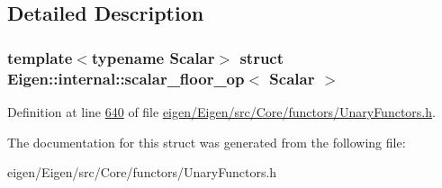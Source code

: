 \subsection{Detailed Description}
\subsubsection*{template$<$typename Scalar$>$\newline
struct Eigen\+::internal\+::scalar\+\_\+floor\+\_\+op$<$ Scalar $>$}



Definition at line \hyperlink{eigen_2_eigen_2src_2_core_2functors_2_unary_functors_8h_source_l00640}{640} of file \hyperlink{eigen_2_eigen_2src_2_core_2functors_2_unary_functors_8h_source}{eigen/\+Eigen/src/\+Core/functors/\+Unary\+Functors.\+h}.



The documentation for this struct was generated from the following file\+:\begin{DoxyCompactItemize}
\item 
eigen/\+Eigen/src/\+Core/functors/\+Unary\+Functors.\+h\end{DoxyCompactItemize}
